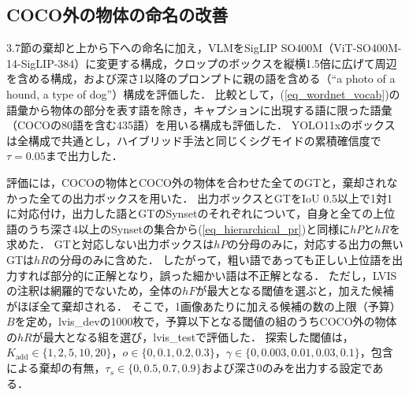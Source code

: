 \begingroup
\color{red}
\subsection{COCO外の物体の命名の改善}
3.7節の棄却と上から下への命名に加え，VLMをSigLIP SO400M（ViT-SO400M-14-SigLIP-384）に変更する構成，クロップのボックスを縦横1.5倍に広げて周辺を含める構成，および深さ1以降のプロンプトに親の語を含める（``a photo of a hound, a type of dog''）構成を評価した．
比較として，(\ref{eq_wordnet_vocab})の語彙から物体の部分を表す語を除き，キャプションに出現する語に限った語彙（COCOの80語を含む435語）を用いる構成も評価した．
YOLO11xのボックスは全構成で共通とし，ハイブリッド手法と同じくシグモイドの累積確信度で$ \tau = 0.05 $まで出力した．

評価には，COCOの物体とCOCO外の物体を合わせた全てのGTと，棄却されなかった全ての出力ボックスを用いた．
出力ボックスとGTをIoU 0.5以上で1対1に対応付け，出力した語とGTのSynsetのそれぞれについて，自身と全ての上位語のうち深さ4以上のSynsetの集合から(\ref{eq_hierarchical_pr})と同様に$ hP $と$ hR $を求めた．
GTと対応しない出力ボックスは$ hP $の分母のみに，対応する出力の無いGTは$ hR $の分母のみに含めた．
したがって，粗い語であっても正しい上位語を出力すれば部分的に正解となり，誤った細かい語は不正解となる．
ただし，LVISの注釈は網羅的でないため，全体の$ hF $が最大となる閾値を選ぶと，加えた候補がほぼ全て棄却される．
そこで，1画像あたりに加える候補の数の上限（予算）$ B $を定め，lvis\_devの1000枚で，予算以下となる閾値の組のうちCOCO外の物体の$ hR $が最大となる組を選び，lvis\_testで評価した．
探索した閾値は，$ K_{\mathrm{add}} \in \{1, 2, 5, 10, 20\} $，$ o \in \{0, 0.1, 0.2, 0.3\} $，$ \gamma \in \{0, 0.003, 0.01, 0.03, 0.1\} $，包含による棄却の有無，$ \tau_s \in \{0, 0.5, 0.7, 0.9\} $および深さ0のみを出力する設定である．

